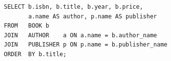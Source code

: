 \begin{lstlisting}[caption={Q1: All books with author and publisher}]
SELECT b.isbn, b.title, b.year, b.price,
       a.name AS author, p.name AS publisher
FROM   BOOK b
JOIN   AUTHOR    a ON a.name = b.author_name
JOIN   PUBLISHER p ON p.name = b.publisher_name
ORDER  BY b.title;
\end{lstlisting}